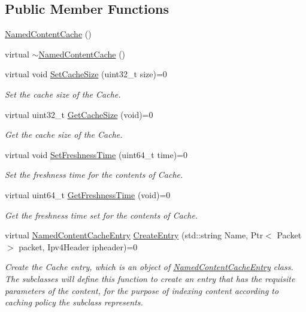 \subsection*{Public Member Functions}
\begin{DoxyCompactItemize}
\item 
\hyperlink{classns3_1_1NamedContentCache_a4c6df9dacea268223c7a1cb9f17de93d}{Named\-Content\-Cache} ()
\item 
virtual \hyperlink{classns3_1_1NamedContentCache_a872f6440953cb44223b8584757f6bcfd}{$\sim$\-Named\-Content\-Cache} ()
\item 
virtual void \hyperlink{classns3_1_1NamedContentCache_ae28605a03a5a4d8b9a3494b4068f44e2}{Set\-Cache\-Size} (uint32\-\_\-t size)=0
\begin{DoxyCompactList}\small\item\em Set the cache size of the Cache. \end{DoxyCompactList}\item 
virtual uint32\-\_\-t \hyperlink{classns3_1_1NamedContentCache_afd9ade17d87082a46cbb745fd0196ab4}{Get\-Cache\-Size} (void)=0
\begin{DoxyCompactList}\small\item\em Get the cache size of the Cache. \end{DoxyCompactList}\item 
virtual void \hyperlink{classns3_1_1NamedContentCache_a92a5e2e641a11d15300f621aa77275ab}{Set\-Freshness\-Time} (uint64\-\_\-t time)=0
\begin{DoxyCompactList}\small\item\em Set the freshness time for the contents of Cache. \end{DoxyCompactList}\item 
virtual uint64\-\_\-t \hyperlink{classns3_1_1NamedContentCache_ac2b0e616d4e866cb2328e986f2ef69e1}{Get\-Freshness\-Time} (void)=0
\begin{DoxyCompactList}\small\item\em Get the freshness time set for the contents of Cache. \end{DoxyCompactList}\item 
virtual \hyperlink{classns3_1_1NamedContentCacheEntry}{Named\-Content\-Cache\-Entry} \hyperlink{classns3_1_1NamedContentCache_a154317526b3883db729c365ab342074a}{Create\-Entry} (std\-::string Name, Ptr$<$ Packet $>$ packet, Ipv4\-Header ipheader)=0
\begin{DoxyCompactList}\small\item\em Create the Cache entry, which is an object of \hyperlink{classns3_1_1NamedContentCacheEntry}{Named\-Content\-Cache\-Entry} class. The subclasses will define this function to create an entry that has the requisite parameters of the content, for the purpose of indexing content according to caching policy the subclass represents. \end{DoxyCompactList}\item 

\end{DoxyCompactItemize}
